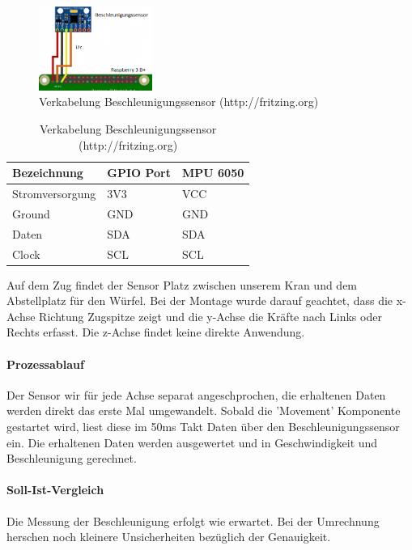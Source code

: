 \documentclass[../../main.tex]{subfiles}
\begin{document}
\begin{table}[H]
  \begin{figure}[H] \centering
    \includegraphics[width=0.33\textwidth]{Verkabelung_BeschlSensor}
    \caption{Verkabelung Beschleunigungssensor (http://fritzing.org)}
    \label{fig:Beschleunigungssensor}
  \end{figure}
  \begin{center}
  \begin{tabular}{lll}
  Bezeichnung     & GPIO Port & MPU 6050 \\ \hline
  Stromversorgung & 3V3      & VCC      \\ \hline
  Ground          & GND      & GND      \\ \hline
  Daten          & SDA      & SDA       \\ \hline
  Clock          & SCL      & SCL       \\ \hline
  \end{tabular}
  \end{center}
\end{table}

Auf dem Zug findet der Sensor Platz zwischen unserem Kran und dem Abstellplatz für den Würfel. Bei der Montage wurde darauf geachtet, dass die x-Achse Richtung Zugspitze zeigt und die y-Achse die Kräfte nach Links oder Rechts erfasst. Die z-Achse findet keine direkte Anwendung.

\paragraph{Prozessablauf}
Der Sensor wir für jede Achse separat angeschprochen, die erhaltenen Daten werden direkt das erste Mal umgewandelt. Sobald die 'Movement' Komponente gestartet wird, liest diese im 50ms Takt Daten über den Beschleunigungssensor ein. Die erhaltenen Daten werden ausgewertet und in Geschwindigkeit und Beschleunigung gerechnet.

\paragraph{Soll-Ist-Vergleich}
Die Messung der Beschleunigung erfolgt wie erwartet. Bei der Umrechnung herschen noch kleinere Unsicherheiten bezüglich der Genauigkeit.
\end{document}
